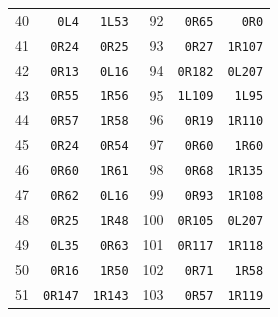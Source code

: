 \begin{center}
\begin{tabular}{rrr@{\hspace{22pt}}rrr}
40 & \texttt{0L4} & \texttt{1L53} & 92 & \texttt{0R65} & \texttt{0R0} \\
41 & \texttt{0R24} & \texttt{0R25} & 93 & \texttt{0R27} & \texttt{1R107} \\
42 & \texttt{0R13} & \texttt{0L16} & 94 & \texttt{0R182} & \texttt{0L207} \\
43 & \texttt{0R55} & \texttt{1R56} & 95 & \texttt{1L109} & \texttt{1L95} \\
44 & \texttt{0R57} & \texttt{1R58} & 96 & \texttt{0R19} & \texttt{1R110} \\
45 & \texttt{0R24} & \texttt{0R54} & 97 & \texttt{0R60} & \texttt{1R60} \\
46 & \texttt{0R60} & \texttt{1R61} & 98 & \texttt{0R68} & \texttt{1R135} \\
47 & \texttt{0R62} & \texttt{0L16} & 99 & \texttt{0R93} & \texttt{1R108} \\
48 & \texttt{0R25} & \texttt{1R48} & 100 & \texttt{0R105} & \texttt{0L207} \\
49 & \texttt{0L35} & \texttt{0R63} & 101 & \texttt{0R117} & \texttt{1R118} \\
50 & \texttt{0R16} & \texttt{1R50} & 102 & \texttt{0R71} & \texttt{1R58} \\
51 & \texttt{0R147} & \texttt{1R143} & 103 & \texttt{0R57} & \texttt{1R119} \\
\bottomrule\end{tabular}\end{center}
\clearpage
